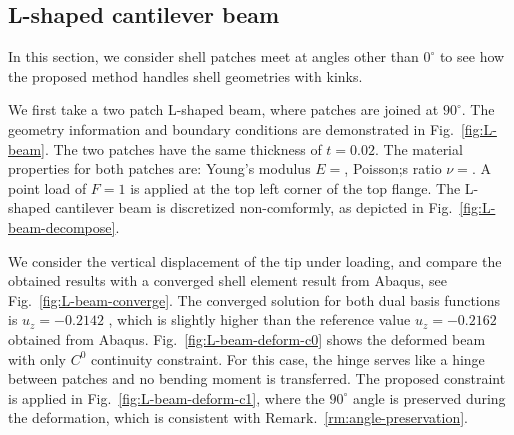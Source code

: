 \documentclass[preprint,12pt]{elsarticle}
\theoremstyle{remark}
\begin{document}
\subsection{L-shaped cantilever beam}
In this section, we consider shell patches meet at angles other than $0^{\circ}$ to see how the proposed method handles shell geometries with kinks. \par

We first take a two patch L-shaped beam, where patches are joined at $90^{\circ}$. The geometry information and boundary conditions are demonstrated in Fig.~\ref{fig:L-beam}. The two patches have the same thickness of $t = 0.02$. The material properties for both patches are: Young’s modulus $E=$, Poisson;s ratio $\nu = $. A point load of $F=1$ is applied at the top left corner of the top flange. The L-shaped cantilever beam is discretized non-comformly, as depicted in Fig.~\ref{fig:L-beam-decompose}.\par

We consider the vertical displacement of the tip under loading, and compare the obtained results with a converged shell element result from Abaqus, see Fig.~\ref{fig:L-beam-converge}. The converged solution for both dual basis functions is $u_z = -0.2142$ , which is slightly higher than the reference value $u_z = -0.2162$ obtained from Abaqus. Fig.~\ref{fig:L-beam-deform-c0} shows the deformed beam with only $C^0$ continuity constraint. For this case, the hinge serves like a hinge between patches and no bending moment is transferred. The proposed constraint is applied in Fig.~\ref{fig:L-beam-deform-c1}, where the $90^{\circ}$ angle is preserved during the deformation, which is consistent with Remark.~\ref{rm:angle-preservation}. \par
\end{document}
